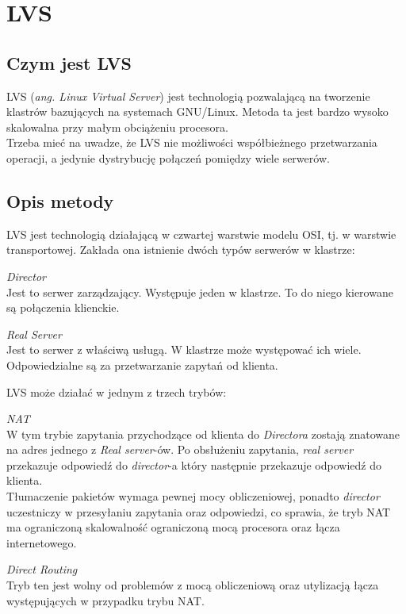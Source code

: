 {\section{LVS}
\subsection{Czym jest LVS}
LVS (\textit{ang. Linux Virtual Server}) jest technologią pozwalającą na tworzenie klastrów bazujących na systemach GNU/Linux.
Metoda ta jest bardzo wysoko skalowalna przy małym obciążeniu procesora.\\
Trzeba mieć na uwadze, że LVS nie możliwości współbieżnego przetwarzania operacji, a jedynie dystrybucję połączeń pomiędzy wiele serwerów.
\subsection{Opis metody}
LVS jest technologią działającą w czwartej warstwie modelu OSI, tj. w warstwie transportowej.
Zakłada ona istnienie dwóch typów serwerów w klastrze:
\begin{description}
	\item{\textit{Director}}\\
		Jest to serwer zarządzający. Występuje jeden w klastrze.
		To do niego kierowane są połączenia klienckie.
	\item{\textit{Real Server}}\\
		Jest to serwer z właściwą usługą. W klastrze może występować ich wiele.
		Odpowiedzialne są za przetwarzanie zapytań od klienta.
\end{description}
LVS może działać w jednym z trzech trybów:
\begin{description}
	\item{\textit{NAT}}\\
		W tym trybie zapytania przychodzące od klienta do \textit{Directora} zostają znatowane na adres jednego z \textit{Real server}-ów.
		Po obsłużeniu zapytania, \textit{real server} przekazuje odpowiedź do \textit{director}-a który następnie przekazuje odpowiedź do klienta.\\
		Tłumaczenie pakietów wymaga pewnej mocy obliczeniowej, ponadto \textit{director} uczestniczy w przesyłaniu zapytania oraz odpowiedzi, co sprawia, że tryb NAT ma ograniczoną skalowalność ograniczoną mocą procesora oraz łącza internetowego.
	\item{\textit{Direct Routing}}\\
		Tryb ten jest wolny od problemów z mocą obliczeniową oraz utylizacją łącza występujących w przypadku trybu NAT.\\

\end{description}}
